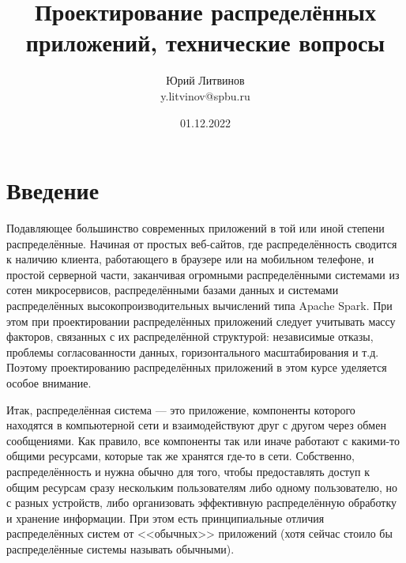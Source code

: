 \documentclass[a5paper]{article}
\title{Проектирование распределённых приложений, технические вопросы}
\author{Юрий Литвинов\\\small{y.litvinov@spbu.ru}}
\date{01.12.2022}
\begin{document}
\maketitle
\thispagestyle{empty}

\section{Введение}

Подавляющее большинство современных приложений в той или иной степени распределённые. Начиная от простых веб-сайтов, где распределённость сводится к наличию клиента, работающего в браузере или на мобильном телефоне, и простой серверной части, заканчивая огромными распределёнными системами из сотен микросервисов, распределёнными базами данных и системами распределённых высокопроизводительных вычислений типа Apache Spark. При этом при проектировании распределённых приложений следует учитывать массу факторов, связанных с их распределённой структурой: независимые отказы, проблемы согласованности данных, горизонтального масштабирования и т.д. Поэтому проектированию распределённых приложений в этом курсе уделяется особое внимание.

Итак, распределённая система --- это приложение, компоненты которого находятся в компьютерной сети и взаимодействуют друг с другом через обмен сообщениями. Как правило, все компоненты так или иначе работают с какими-то общими ресурсами, которые так же хранятся где-то в сети. Собственно, распределённость и нужна обычно для того, чтобы предоставлять доступ к общим ресурсам сразу нескольким пользователям либо одному пользователю, но с разных устройств, либо организовать эффективную распределённую обработку и хранение информации. При этом есть принципиальные отличия распределённых систем от <<обычных>> приложений (хотя сейчас стоило бы распределённые системы называть обычными).
\end{document}
